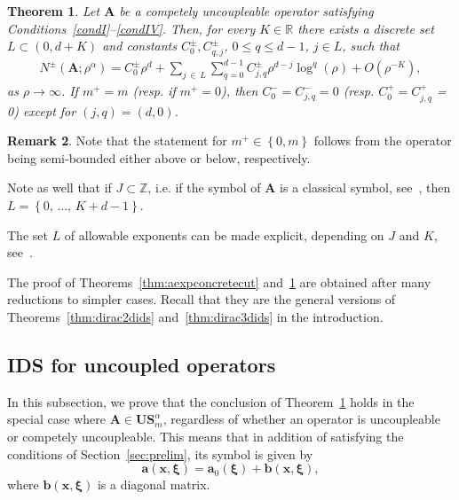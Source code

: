 \documentclass[10pt]{amsart}
\newtheorem{theo}{Theorem}[section]
\theoremstyle{definition}\newtheorem{defi}[theo]{Definition}\newtheorem{rema}[theo]{Remark}\newtheorem{exam}[theo]{Example}\newtheorem{nota}[theo]{Notation}
\newcommand{\R}{\mathbb R}
\newcommand{\Z}{\mathbb Z}
\newcommand{\bxi}{\boldsymbol \xi}
\newcommand{\ba}{\mathbf a}
\newcommand{\BA}{\mathbf A}
\newcommand{\BS}{\mathbf S}
\newcommand{\BU}{\mathbf U}
\newcommand{\bx}{\mathbf x}
\newcommand{\bbb}{\mathbf b}
\newcommand{\pd}{uncoupleable}
\newcommand{\mpu}{competely uncoupleable}
\newcommand{\bigo}[1]{O\left(#1 \right)}
\newcommand{\set}[1]{\left\{ #1 \right\}}
\begin{document}
\begin{theo} \label{thm:aexpconcrete}
Let $\BA$ be a \mpu{} operator satisfying Conditions~\ref{condI}--\ref{condIV}. Then, for every $K \in \R$ there exists a discrete set $L \subset (0,d+K)$ and constants $C_0^\pm, C_{q,j}^\pm$, $0 \le q \le d-1$, $j \in L$, such that
\begin{equation}
\begin{aligned}
N^\pm\left(\BA; \rho^\alpha \right) = C_0^\pm \rho^d +
\sum_{j\,\in\,L}\sum_{q =0}^{d-1} C_{j,q}^\pm \rho^{d-j} \log^q(\rho) + \bigo{\rho^{-K}},
\end{aligned}\label{eq:asymptoticsconcrete}
\end{equation}
as $\rho \to \infty$. If $m^+ = m$ (resp. if $m^+ = 0$), then $C_0^- = C^-_{j,q} = 0$ (resp. $C_0^+ = C^+_{j,q}$ = 0) except for $(j,q) = (d,0)$.
\end{theo}


\begin{rema}
Note that the statement for $m^+ \in \set{0,m}$ follows from the operator being semi-bounded either above or below, respectively.

Note as well that if $J \subset \Z$, i.e. if the symbol of $\BA$ is a classical symbol, see~\cite[Chapter~7]{TaylorII}, then $L=
\set{0,\,\dotsc,\,K + d - 1}$.

The set $L$ of allowable exponents can be made explicit, depending on $J$ and $K$, see~\cite[Remark~2.7]{MorParSht2014}.
\end{rema}

The proof of Theorems~\ref{thm:aexpconcretecut} and~\ref{thm:aexpconcrete} are obtained after many reductions to simpler cases. Recall that they are the general versions of Theorems~\ref{thm:dirac2dids} and~\ref{thm:dirac3dids} in the introduction.

\subsection{IDS for uncoupled operators} \label{sec:uncoupled}

In this subsection, we prove that the conclusion of Theorem~\ref{thm:aexpconcrete} holds in the special case where $\BA \in \BU\BS_m^\alpha$, regardless of whether an operator is \pd{} or \mpu{}. This means that in addition of satisfying the conditions of Section~\ref{sec:prelim}, its symbol is given by
\begin{equation}\label{eq:modeldmapo}
\ba(\bx,\bxi) = \ba_0(\bxi) + \bbb(\bx,\bxi),
\end{equation}
where $\bbb(\bx,\bxi)$ is a diagonal matrix.
\end{document}
